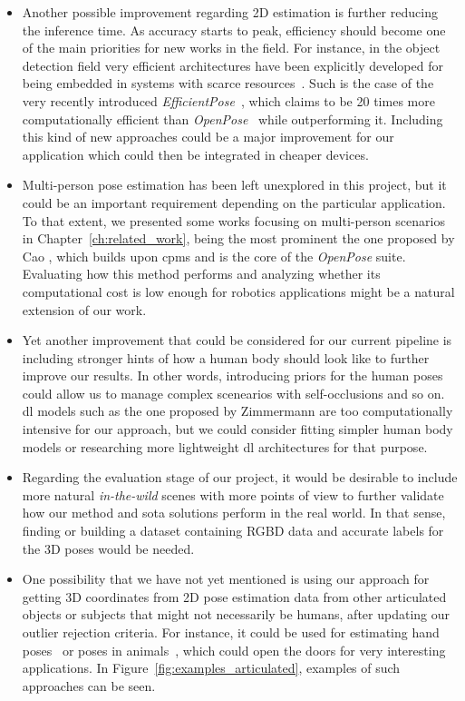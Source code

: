 \begin{itemize}
    \item Another possible improvement regarding 2D estimation is further reducing the inference time. As accuracy starts to peak, efficiency should become one of the main priorities for new works in the field. For instance, in the object detection field very efficient architectures have been explicitly developed for being embedded in systems with scarce resources~\cite{sandler2018mobilenetv2}. Such is the case of the very recently introduced \emph{EfficientPose}~\cite{groos2020efficientpose}, which claims to be 20 times more computationally efficient than \emph{OpenPose}~\cite{cao2018openpose} while outperforming it. Including this kind of new approaches could be a major improvement for our application which could then be integrated in cheaper devices.
    \item Multi-person pose estimation has been left unexplored in this project, but it could be an important requirement depending on the particular application. To that extent, we presented some works focusing on multi-person scenarios in Chapter~\ref{ch:related_work}, being the most prominent the one proposed by Cao \etal\cite{cao2018openpose}, which builds upon \glspl{cpm} and is the core of the \emph{OpenPose} suite. Evaluating how this method performs and analyzing whether its computational cost is low enough for robotics applications might be a natural extension of our work.
    \item Yet another improvement that could be considered for our current pipeline is including stronger hints of how a human body should look like to further improve our results. In other words, introducing priors for the human poses could allow us to manage complex scenearios with self-occlusions and so on. \gls{dl} models such as the one proposed by Zimmermann \etal\cite{Zimmermann2018-sn} are too computationally intensive for our approach, but we could consider fitting simpler human body models or researching more lightweight \gls{dl} architectures for that purpose.
    \item Regarding the evaluation stage of our project, it would be desirable to include more natural \textit{in-the-wild} scenes with more points of view to further validate how our method and \gls{sota} solutions perform in the real world. In that sense, finding or building a dataset containing RGBD data and accurate labels for the 3D poses would be needed.
    \item One possibility that we have not yet mentioned is using our approach for getting 3D coordinates from 2D pose estimation data from other articulated objects or subjects that might not necessarily be humans, after updating our outlier rejection criteria. For instance, it could be used for estimating hand poses~\cite{Chang2018} or poses in animals~\cite{kearney2020rgbd}, which could open the doors for very interesting applications. In Figure~\ref{fig:examples_articulated}, examples of such approaches can be seen.
    

\end{itemize}
